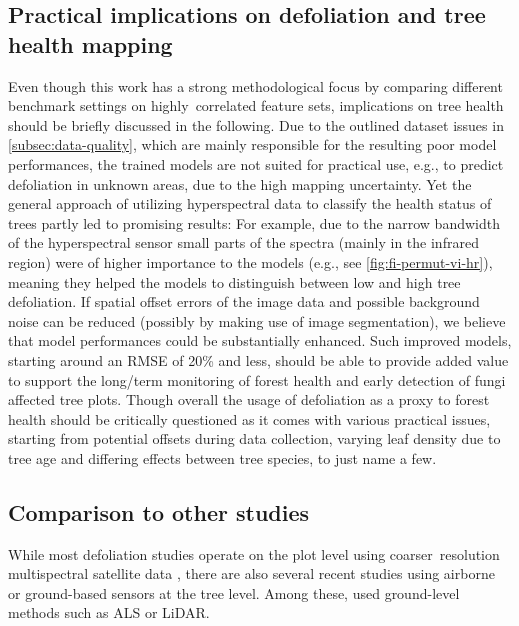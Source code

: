 \documentclass[remotesensing,article,submit,moreauthors,pdftex]{Definitions/mdpi}
\begin{document}
\subsection{Practical implications on defoliation and tree health mapping}
Even though this work has a strong methodological focus by comparing different benchmark settings on highly\ correlated feature sets, implications on tree health should be briefly discussed in the following.
Due to the outlined dataset issues in \autoref{subsec:data-quality}, which are mainly responsible for the resulting poor model performances, the trained models are not suited for practical use, e.g., to predict defoliation in unknown areas, due to the high mapping uncertainty.
Yet the general approach of utilizing hyperspectral data to classify the health status of trees partly led to promising results:
For example, due to the narrow bandwidth of the hyperspectral sensor small parts of the spectra (mainly in the infrared region) were of higher importance to the models (e.g., see \autoref{fig:fi-permut-vi-hr}), meaning they helped the models to distinguish between low and high tree defoliation.
If spatial offset errors of the image data and possible background noise can be reduced (possibly by making use of image segmentation), we believe that model performances could be substantially enhanced.
Such improved models, starting around an RMSE of 20\% and less, should be able to provide added value to support the long\-/term monitoring of forest health and early detection of fungi affected tree plots.
Though overall the usage of defoliation as a proxy to forest health should be critically questioned as it comes with various practical issues, starting from potential offsets during data collection, varying leaf density due to tree age and differing effects between tree species, to just name a few.

\subsection{Comparison to other studies}

While most defoliation studies operate on the plot level using coarser\ resolution multispectral satellite data \cite{townsend2012, debeurs2008, rengarajan2016}, there are also several recent studies using airborne or ground-based sensors at the tree level.
Among these, \cite{meng2018, kalin2019} used ground-level methods such as \ac{ALS} or \ac{LiDAR}.
\end{document}
